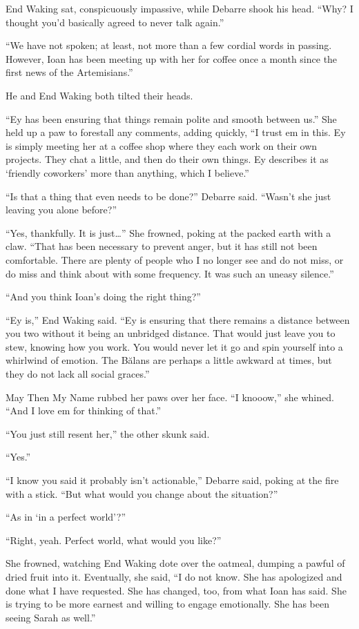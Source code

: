 End Waking sat, conspicuously impassive, while Debarre shook his head. ``Why? I thought you'd basically agreed to never talk again.''

``We have not spoken; at least, not more than a few cordial words in passing. However, Ioan has been meeting up with her for coffee once a month since the first news of the Artemisians.''

He and End Waking both tilted their heads.

``Ey has been ensuring that things remain polite and smooth between us.'' She held up a paw to forestall any comments, adding quickly, ``I trust em in this. Ey is simply meeting her at a coffee shop where they each work on their own projects. They chat a little, and then do their own things. Ey describes it as `friendly coworkers' more than anything, which I believe.''

``Is that a thing that even needs to be done?'' Debarre said. ``Wasn't she just leaving you alone before?''

``Yes, thankfully. It is just\ldots{}'' She frowned, poking at the packed earth with a claw. ``That has been necessary to prevent anger, but it has still not been comfortable. There are plenty of people who I no longer see and do not miss, or do miss and think about with some frequency. It was such an uneasy silence.''

``And you think Ioan's doing the right thing?''

``Ey is,'' End Waking said. ``Ey is ensuring that there remains a distance between you two without it being an unbridged distance. That would just leave you to stew, knowing how you work. You would never let it go and spin yourself into a whirlwind of emotion. The Bălans are perhaps a little awkward at times, but they do not lack all social graces.''

May Then My Name rubbed her paws over her face. ``I knooow,'' she whined. ``And I love em for thinking of that.''

``You just still resent her,'' the other skunk said.

``Yes.''

``I know you said it probably isn't actionable,'' Debarre said, poking at the fire with a stick. ``But what would you change about the situation?''

``As in `in a perfect world'?''

``Right, yeah. Perfect world, what would you like?''

She frowned, watching End Waking dote over the oatmeal, dumping a pawful of dried fruit into it. Eventually, she said, ``I do not know. She has apologized and done what I have requested. She has changed, too, from what Ioan has said. She is trying to be more earnest and willing to engage emotionally. She has been seeing Sarah as well.''

